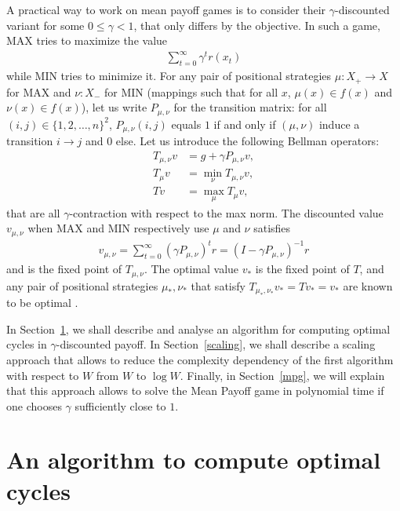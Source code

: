 \documentclass{article}
\def\Xmax{X_{+}}
\def\Xmin{X_{-}}
\begin{document}
A practical way to work on mean payoff games is to consider their $\gamma$-discounted variant for some $0\le \gamma<1$, that only differs by the objective. In such a game, MAX tries to maximize the value
\begin{align}
\sum_{t=0}^{\infty} \gamma^t r(x_t)
\end{align}
while MIN tries to minimize it.
For any pair of positional strategies $\mu:\Xmax \to X$ for MAX and $\nu:\Xmin$ for MIN (mappings such that for all $x$, $\mu(x) \in f(x)$ and $\nu(x) \in f(x)$), let us write $P_{\mu,\nu}$ for the transition matrix: for all $(i,j) \in \{1,2,\dots,n\}^2$, $P_{\mu,\nu}(i,j)$ equals $1$ if and only if $(\mu,\nu)$ induce a transition $i \to j$ and $0$ else. Let us introduce the following Bellman operators:
\begin{align}
  T_{\mu,\nu}v &= g + \gamma P_{\mu,\nu}v, \\
  T_{\mu}v & = \min_\nu T_{\mu,\nu}v, \\
  T v &= \max_\mu T_{\mu}v,
\end{align}
that are all $\gamma$-contraction with respect to the max norm.
The discounted value $v_{\mu,\nu}$ when MAX and MIN respectively use $\mu$ and $\nu$ satisfies
\begin{align}
  v_{\mu,\nu} = \sum_{t=0}^{\infty} (\gamma P_{\mu,\nu})^t r = (I-\gamma P_{\mu,\nu})^{-1} r
\end{align}
and is the fixed point of $T_{\mu,\nu}$. The optimal value $v_*$ is the fixed point of $T$, and any pair of positional strategies $\mu_*,\nu_*$ that satisfy $T_{\mu_*,\nu_*}v_*= T v_* = v_*$ are known to be optimal \cite{puterman}.

In Section~\ref{algo}, we shall describe and analyse an algorithm for computing optimal cycles in $\gamma$-discounted payoff. In Section~\ref{scaling}, we shall describe a scaling approach that allows to reduce the complexity dependency of the first algorithm with respect to $W$ from $W$ to $\log W$. Finally, in Section~\ref{mpg}, we will explain that this approach allows to solve the Mean Payoff game in polynomial time if one chooses $\gamma$ sufficiently close to $1$.



\section{An algorithm to compute optimal cycles}
\label{algo}
\end{document}

